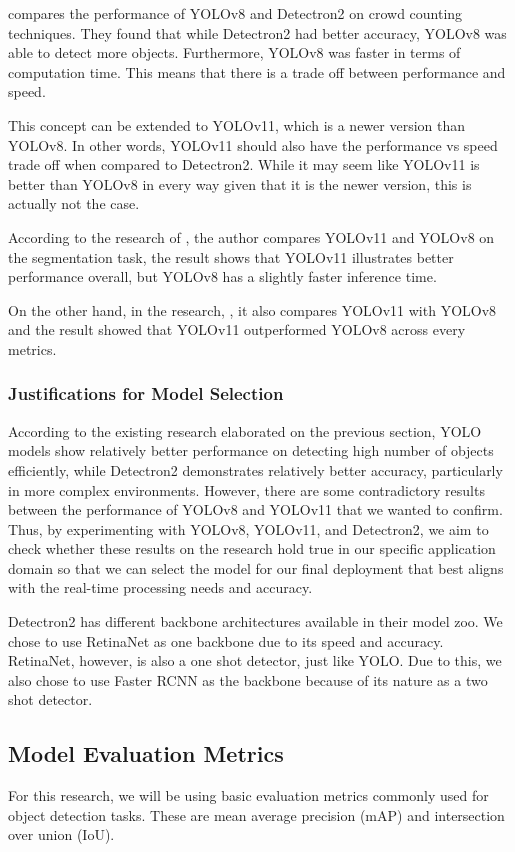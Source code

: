 \documentclass[stu,12pt,floatsintext]{apa7}
\begin{document}
\textcite{wadhwa_comparison_2023} compares the performance of YOLOv8 and Detectron2 on crowd counting techniques. They found that while Detectron2 had better accuracy, YOLOv8 was able to detect more objects. Furthermore, YOLOv8 was faster in terms of computation time. This means that there is a trade off between performance and speed.

This concept can be extended to YOLOv11, which is a newer version than YOLOv8. In other words, YOLOv11 should also have the performance vs speed trade off when compared to Detectron2. While it may seem like YOLOv11 is better than YOLOv8 in every way given that it is the newer version, this is actually not the case.

According to the research of \textcite{sapkota_comparing_2024}, the author compares YOLOv11 and YOLOv8 on the segmentation task, the result shows that YOLOv11 illustrates better performance overall, but YOLOv8 has a slightly faster inference time.

On the other hand, in the research, \textcite{alif_yolov11_2024}, it also compares YOLOv11 with YOLOv8 and the result showed that YOLOv11 outperformed YOLOv8 across every metrics.

\subsubsection{Justifications for Model Selection}

According to the existing research elaborated on the previous section, YOLO models show relatively better performance on detecting high number of objects efficiently, while Detectron2 demonstrates relatively better accuracy, particularly in more complex environments. However, there are some contradictory results between the performance of YOLOv8 and YOLOv11 that we wanted to confirm. Thus, by experimenting with YOLOv8, YOLOv11, and Detectron2, we aim to check whether these results on the research hold true in our specific application domain so that we can select the model for our final deployment that best aligns with the real-time processing needs and accuracy.

Detectron2 has different backbone architectures available in their model zoo. We chose to use RetinaNet as one backbone due to its speed and accuracy. RetinaNet, however, is also a one shot detector, just like YOLO. Due to this, we also chose to use Faster RCNN as the backbone because of its nature as a two shot detector.

\subsection{Model Evaluation Metrics}
For this research, we will be using basic evaluation metrics commonly used for object detection tasks. These are mean average precision (mAP) and intersection over union (IoU).
\end{document}
